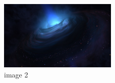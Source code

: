\documentclass[conference]{IEEEtran}
\begin{document}
\begin{figure}[h]
\centering
\includegraphics[width=0.5\textwidth]{..//uploads/1740581318803.jpg}
\caption{image 2}
\end{figure}
    
  




\begin{thebibliography}{1}

  
    
  

\end{thebibliography}
\end{document}
